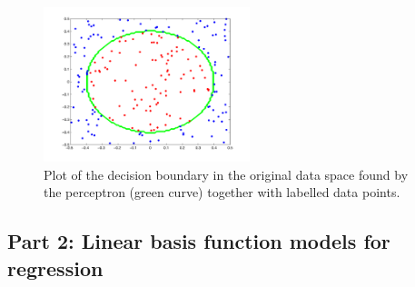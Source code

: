 \documentclass[a4]{article}
\begin{document}
\begin{figure}[!h]
\begin{center}
\centering
	\includegraphics[width=6cm]{../figures/perceptron.pdf}
\end{center}
\caption{\label{fig:perceptron}Plot of the decision boundary in the original data space found by the perceptron (green curve) together with labelled data points.}
\end{figure}

\subsection{Part 2: Linear basis function models for regression}

\end{document}
